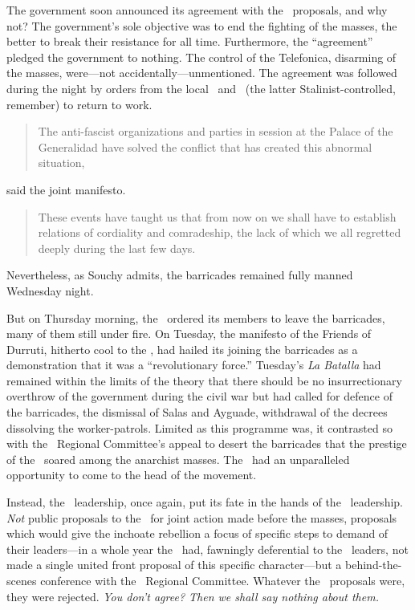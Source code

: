 The government soon announced its agreement with the \CNT\ proposals, and why not? The government’s sole objective was to end the fighting of the masses, the better to break their resistance for all time. Furthermore, the ``agreement'' pledged the government to nothing. The control of the Telefonica, disarming of the masses, were---not accidentally---unmentioned. The agreement was followed during the night by orders from the local \CNT\ and \UGT\ (the latter Stalinist-controlled, remember) to return to work.

\begin{quotation}
  The anti-fascist organizations and parties in session at the Palace of the Generalidad have solved the conflict that has created this abnormal situation,
\end{quotation}
said the joint manifesto.

\begin{quotation}
  \noindent
  These events have taught us that from now on we shall have to establish relations of cordiality and comradeship, the lack of which we all regretted deeply during the last few days.
\end{quotation}

Nevertheless, as Souchy admits, the barricades remained fully manned Wednesday night.

But on Thursday morning, the \POUM\ ordered its members to leave the barricades, many of them still under fire. On Tuesday, the manifesto of the Friends of Durruti, hitherto cool to the \POUM, had hailed its joining the barricades as a demonstration that it was a ``revolutionary force.'' Tuesday’s \emph{La Batalla} had remained within the limits of the theory that there should be no insurrectionary overthrow of the government during the civil war but had called for defence of the barricades, the dismissal of Salas and Ayguade, withdrawal of the decrees dissolving the worker-patrols. Limited as this programme was, it contrasted so with the \CNT\ Regional Committee’s appeal to desert the barricades that the prestige of the \POUM\ soared among the anarchist masses. The \POUM\ had an unparalleled opportunity to come to the head of the movement.

Instead, the \POUM\ leadership, once again, put its fate in the hands of the \CNT\ leadership. \emph{Not} public proposals to the \CNT\ for joint action made before the masses, proposals which would give the inchoate rebellion a focus of specific steps to demand of their leaders---in a whole year the \POUM\ had, fawningly deferential to the \CNT\ leaders, not made a single united front proposal of this specific character---but a behind-the-scenes conference with the \CNT\ Regional Committee. Whatever the \POUM\ proposals were, they were rejected. \emph{You don’t agree? Then we shall say nothing about them.}

